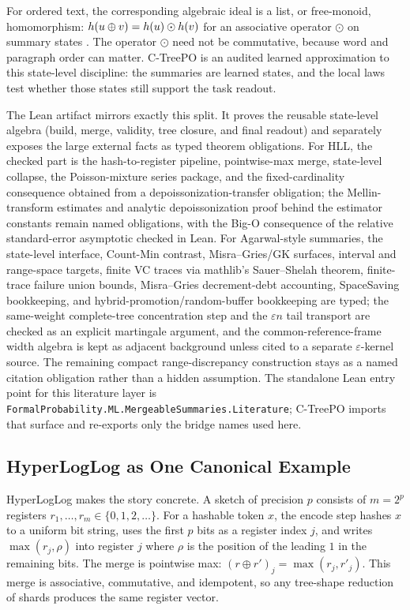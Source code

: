 For ordered text, the corresponding algebraic ideal is a list, or free-monoid,
homomorphism: $h(u \oplus v) = h(u) \odot h(v)$ for an associative operator
$\odot$ on summary states \citep{Gibbons1996ThirdHomomorphism}. The operator
$\odot$ need not be commutative, because word and paragraph order can matter.
C-TreePO is an audited learned approximation to this state-level discipline:
the summaries are learned states, and the local laws test whether those states
still support the task readout.

The Lean artifact mirrors exactly this split. It proves the reusable
state-level algebra (build, merge, validity, tree closure, and final
readout) and separately exposes the large external facts as typed theorem
obligations. For HLL, the checked part is the hash-to-register pipeline,
pointwise-max merge, state-level collapse, the Poisson-mixture series package,
and the fixed-cardinality consequence obtained from a depoissonization-transfer
obligation; the Mellin-transform estimates and analytic depoissonization proof
behind the estimator constants remain named obligations, with the Big-O
consequence of the relative standard-error asymptotic checked in Lean. For
Agarwal-style summaries, the
state-level interface, Count-Min contrast, Misra--Gries/GK surfaces, interval
and range-space targets, finite VC traces via mathlib's
Sauer--Shelah theorem, finite-trace failure union bounds,
Misra--Gries decrement-debt accounting, SpaceSaving bookkeeping, and
hybrid-promotion/random-buffer bookkeeping are typed; the
same-weight complete-tree concentration step and the $\varepsilon n$ tail
transport are checked as an explicit martingale argument, and the
common-reference-frame width algebra is kept as adjacent background unless
cited to a separate $\varepsilon$-kernel source. The remaining compact
range-discrepancy construction stays as a named citation obligation rather
than a hidden assumption. The standalone Lean entry point for
this literature layer is
\texttt{FormalProbability.ML.MergeableSummaries.Literature}; C-TreePO imports
that surface and re-exports only the bridge names used here.

\subsection{HyperLogLog as One Canonical Example}\label{sec:hll-primer}

HyperLogLog makes the story concrete. A sketch of precision $p$ consists of
$m = 2^p$ registers $r_1, \ldots, r_m \in \{0, 1, 2, \ldots\}$. For a
hashable token $x$, the encode step hashes $x$ to a uniform bit string,
uses the first $p$ bits as a register index $j$, and writes $\max(r_j, \rho)$
into register $j$ where $\rho$ is the position of the leading $1$ in the
remaining bits. The merge is pointwise max: $(r \oplus r')_j = \max(r_j, r'_j)$.
This merge is associative, commutative, and idempotent, so any tree-shape
reduction of shards produces the same register vector.


